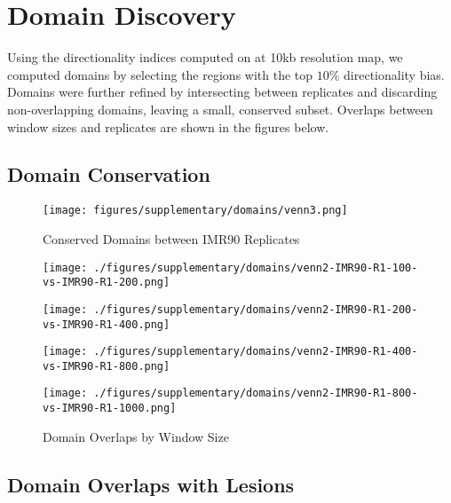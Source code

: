 \newpage
\section*{Domain Discovery}

Using the directionality indices computed on at 10kb resolution map, we computed domains by selecting the regions with the top
$10\%$ directionality bias.  Domains were further refined by intersecting between replicates and discarding non-overlapping
domains, leaving a small, conserved subset.  Overlaps between window sizes and replicates are shown in the figures below.

\subsection*{Domain Conservation}\label{sec:domainConservation}

\begin{figure}[H]
  \centering
  \caption{Conserved Domains between IMR90 Replicates}
  \texttt{[image: figures/supplementary/domains/venn3.png]}\label{fig:SuppVenn3}
\end{figure}

\begin{figure}[H]
  \caption{Domain Overlaps by Window Size}
  \begin{minipage}{0.45\textwidth}%
    \texttt{[image: ./figures/supplementary/domains/venn2-IMR90-R1-100-vs-IMR90-R1-200.png]}
  \end{minipage}%
  \hfill
  \begin{minipage}{0.45\textwidth}
    \centering
    \texttt{[image: ./figures/supplementary/domains/venn2-IMR90-R1-200-vs-IMR90-R1-400.png]}
  \end{minipage}%

  \vfill

  \begin{minipage}{0.45\textwidth}%
    \texttt{[image: ./figures/supplementary/domains/venn2-IMR90-R1-400-vs-IMR90-R1-800.png]}
  \end{minipage}%
  \hfill
  \begin{minipage}{0.45\textwidth}
    \centering
    \texttt{[image: ./figures/supplementary/domains/venn2-IMR90-R1-800-vs-IMR90-R1-1000.png]}
  \end{minipage}
\end{figure}
\newpage

\subsection*{Domain Overlaps with Lesions}

